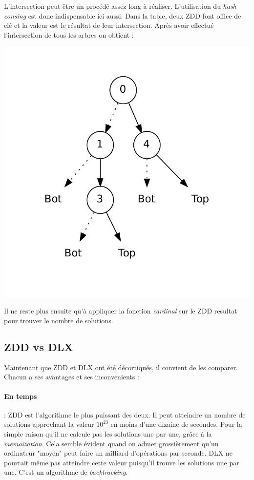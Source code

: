 \documentclass[a4paper]{article}
\begin{document}
L'intersection peut être un procédé assez long à réaliser. L'utilisation 
du \emph{hash consing} est donc indispensable ici aussi. Dans la table, deux 
ZDD font office de clé et la valeur est le résultat de leur intersection.
Après avoir effectué l'intersection de tous les arbres on obtient : 


\begin{center}
\includegraphics[scale=0.6]{../imports/inter.pdf}
\end{center}

Il ne reste plus ensuite qu'à appliquer la fonction \emph{cardinal} 
sur le ZDD resultat pour trouver le nombre de solutions. 

\subsection{ZDD vs DLX}

Maintenant que ZDD et DLX ont été décortiqués, il convient de les comparer.
Chacun a ses avantages et ses inconvenients :  


\paragraph{En temps}

: ZDD est l'algorithme le plus puissant des deux. Il peut
atteindre un nombre de solutions approchant la valeur $10^{23}$ en moins d'une 
dizaine de secondes. Pour la simple raison qu'il ne calcule pas les solutions
une par une, grâce à la \emph{memoïzation}. Cela semble évident quand on admet
grossièrement qu'un ordinateur "moyen" peut faire un milliard d'opérations par
seconde. DLX ne pourrait même pas atteindre cette valeur puisqu'il trouve les 
solutions une par une. C'est un algorithme de \emph{backtracking}.
\end{document}
